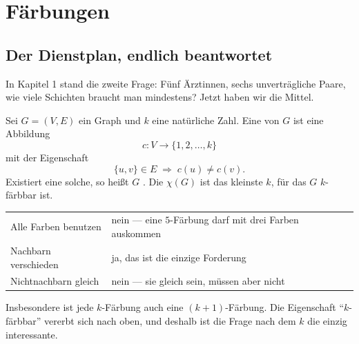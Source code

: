 \chapter{Färbungen}

\section{Der Dienstplan, endlich beantwortet}

In Kapitel 1 stand die zweite Frage: Fünf Ärztinnen, sechs unverträgliche Paare, wie viele Schichten braucht man mindestens? Jetzt haben wir die Mittel.

\begin{definition}
Sei $G = (V,E)$ ein Graph und $k$ eine natürliche Zahl. Eine  von $G$ ist eine Abbildung
\[ c : V \longrightarrow \{1, 2, \ldots, k\} \]
mit der Eigenschaft
\[ \{u,v\} \in E \;\Longrightarrow\; c(u) \neq c(v) . \]
Existiert eine solche, so heißt $G$ . Die  $\chi(G)$ ist das kleinste $k$, für das $G$ $k$-färbbar ist.
\end{definition}

\begin{warnung}
\begin{center}
\renewcommand{\arraystretch}{1.5}
\begin{tabular}{@{}P{3.4cm}P{5.2cm}@{}}
\toprule
Alle Farben benutzen & nein --- eine $5$-Färbung darf mit drei Farben auskommen\\
Nachbarn verschieden & \textcolor{gruen}{ja, das ist die einzige Forderung}\\
Nichtnachbarn gleich & nein --- sie  gleich sein, müssen aber nicht\\
\bottomrule
\end{tabular}
\end{center}

Insbesondere ist jede $k$-Färbung auch eine $(k+1)$-Färbung. Die Eigenschaft \enquote{$k$-färbbar} vererbt sich nach oben, und deshalb ist die Frage nach dem  $k$ die einzig interessante.
\end{warnung}

